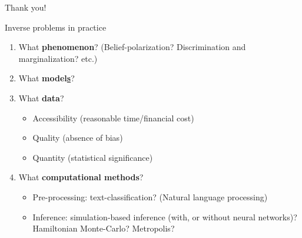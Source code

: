 \documentclass[10pt]{beamer}
\begin{document}
\begin{frame}{Thank you!}
    \nocite{radev2021amortized}
    \printbibliography[heading=none]
\end{frame}

\begin{frame}{Inverse problems in practice}
\begin{enumerate}
    \item What \textbf{phenomenon}? (Belief-polarization? Discrimination and marginalization? etc.)
    \item What \textbf{model\underline{s}}? 
    \item What \textbf{data}?
    \begin{itemize}
        \item Accessibility (reasonable time/financial cost)
        \item Quality (absence of bias)
        \item Quantity (statistical significance)
    \end{itemize}
    \item What \textbf{computational methods}?
    \begin{itemize}
        \item Pre-processing: text-classification? (Natural language processing)
        \item Inference: simulation-based inference (with, or without neural networks)? Hamiltonian Monte-Carlo? Metropolis?
    \end{itemize}
\end{enumerate}
\end{frame}
\end{document}
